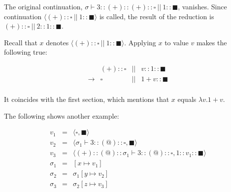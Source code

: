 The original continuation, $\sigma\vdash 3::(+)::(+)::\square\ ||\
1::\blacksquare$, vanishes. Since continuation $\langle(+)::\square\ ||\
1::\blacksquare\rangle$ is called, the result of the reduction is $(+)::\square\
||\ 2::1::\blacksquare$.

Recall that $x$ denotes $\langle(+)::\square\ ||\ 1::\blacksquare\rangle$.
Applying $x$ to value $v$ makes the following true:

\[\begin{array}{lrcr}
& (+)::\square &||&  v::1::\blacksquare \\
\rightarrow & \square &||&  1+v::\blacksquare \\
\end{array}\]

It coincides with the first section, which mentions that $x$ equals $\lambda
v.1+v$.

The following shows another example:

\[
\begin{array}{rcl}
v_1&=&\langle\square,\blacksquare\rangle\\
v_2&=&\langle\sigma_1\vdash3::(@)::\square,\blacksquare\rangle\\

v_3&=&\langle(+)::(@)::\sigma_1\vdash3::(@)::\square,1::v_1::\blacksquare\rangle\\
\sigma_1&=&[x\mapsto v_1] \\
\sigma_2&=&\sigma_1[y\mapsto v_2] \\
\sigma_3&=&\sigma_2[z\mapsto v_3]
\end{array}
\]

